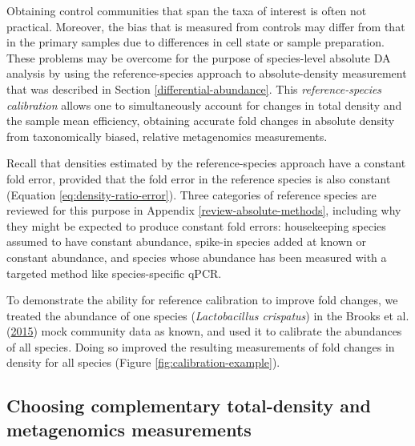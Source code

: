 \documentclass[
]{article}
\begin{document}
Obtaining control communities that span the taxa of interest is often not practical.
Moreover, the bias that is measured from controls may differ from that in the primary samples due to differences in cell state or sample preparation.
These problems may be overcome for the purpose of species-level absolute DA analysis by using the reference-species approach to absolute-density measurement that was described in Section \ref{differential-abundance}.
This \emph{reference-species calibration} allows one to simultaneously account for changes in total density and the sample mean efficiency, obtaining accurate fold changes in absolute density from taxonomically biased, relative metagenomics measurements.

Recall that densities estimated by the reference-species approach have a constant fold error, provided that the fold error in the reference species is also constant (Equation \eqref{eq:density-ratio-error}).
Three categories of reference species are reviewed for this purpose in Appendix \ref{review-absolute-methods}, including why they might be expected to produce constant fold errors: housekeeping species assumed to have constant abundance, spike-in species added at known or constant abundance, and species whose abundance has been measured with a targeted method like species-specific qPCR.

To demonstrate the ability for reference calibration to improve fold changes, we treated the abundance of one species (\emph{Lactobacillus crispatus}) in the Brooks et al. (\protect\hyperlink{ref-brooks2015thet}{2015}) mock community data as known, and used it to calibrate the abundances of all species.
Doing so improved the resulting measurements of fold changes in density for all species (Figure \ref{fig:calibration-example}).

\hypertarget{choosing-complementary-total-density-and-metagenomics-measurements}{%
\subsection{Choosing complementary total-density and metagenomics measurements}\label{choosing-complementary-total-density-and-metagenomics-measurements}}
\end{document}
